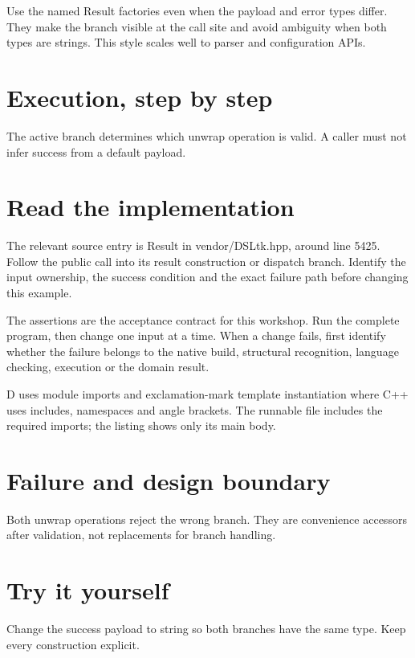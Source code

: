 \clearpage
{}
Use the named Result factories even when the payload and error types differ. They make the branch visible at the call site and avoid ambiguity when both types are strings. This style scales well to parser and configuration APIs.


\section*{Execution, step by step}
The active branch determines which unwrap operation is valid. A caller must not infer success from a default payload.

\section*{Read the implementation}
The relevant source entry is Result in vendor/DSLtk.hpp, around line 5425. Follow the public call into its result construction or dispatch branch. Identify the input ownership, the success condition and the exact failure path before changing this example.

The assertions are the acceptance contract for this workshop. Run the complete program, then change one input at a time. When a change fails, first identify whether the failure belongs to the native build, structural recognition, language checking, execution or the domain result.

\clearpage
{}
D uses module imports and exclamation-mark template instantiation where C++ uses includes, namespaces and angle brackets. The runnable file includes the required imports; the listing shows only its main body.


\section*{Failure and design boundary}
Both unwrap operations reject the wrong branch. They are convenience accessors after validation, not replacements for branch handling.

\section*{Try it yourself}
Change the success payload to string so both branches have the same type. Keep every construction explicit.

